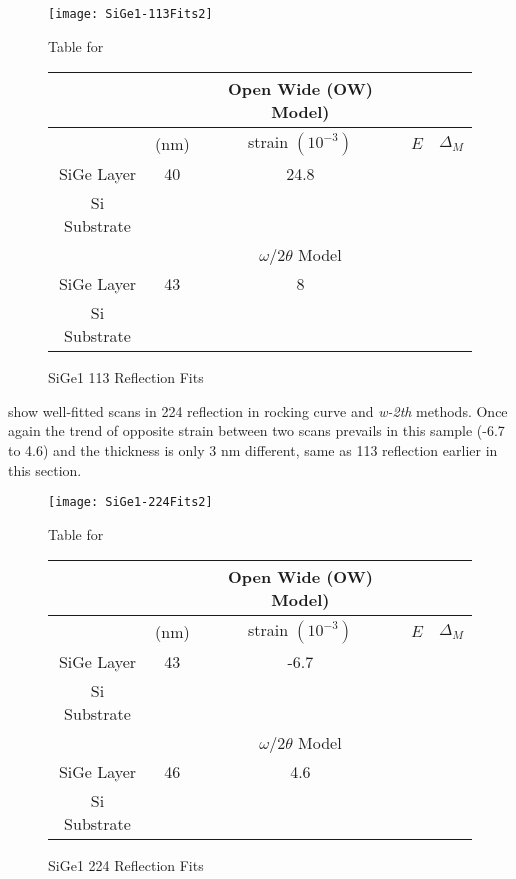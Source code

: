 \begin{figure}[hc]%
\caption{SiGe1 113 Reflection Fits}
\label{SiGe1-113}
\begin{minipage}{0.85\linewidth}
\texttt{[image: SiGe1-113Fits2]}
\end{minipage}
\begin{minipage}{\linewidth}
\centering
\vspace{10pt}
Table for \\
\vspace{5pt}
\begin{tabular}{c|cccc}
			& 	&Open Wide (OW) Model)	 \\
\hline
			&	(nm)	&	strain	 $(10^{-3})$&	$E$ &  $\Delta_M$\\
\hline
SiGe Layer		&  	40	&   24.8	 &\textendash & \textendash\ 	\\
Si Substrate		&	\textemdash & \textemdash&\textemdash\ &\textemdash	\\
\hline
			& &$\omega/2\theta$ Model \\
\hline
SiGe Layer		&	43	& 8	&\textendash&\textendash\ 	\\
Si Substrate		&	\textemdash & \textemdash&\textemdash\ &\textemdash
\end{tabular}
\end{minipage}
\end{figure}

  show well-fitted scans in 224 reflection in rocking curve and \emph{w-2th} methods.  Once again the trend of opposite strain between two scans prevails in this sample (-6.7 to 4.6) and the thickness is only 3 nm different, same as 113 reflection earlier in this section.

\begin{figure}[hc]%
\caption{SiGe1 224 Reflection Fits}
\label{SiGe1-224}
\begin{minipage}{0.85\linewidth}
\texttt{[image: SiGe1-224Fits2]}
\end{minipage}
\begin{minipage}{\linewidth}
\centering
\vspace{10pt}
Table for \\
\vspace{5pt}
\begin{tabular}{c|cccc}
			& 	&Open Wide (OW) Model)	 \\
\hline
			&	(nm)	&	strain	 $(10^{-3})$&	$E$ &  $\Delta_M$\\
\hline
SiGe Layer		&  	43	&      -6.7 &\textendash & \textendash\ 	\\
Si Substrate		&	\textemdash & \textemdash&\textemdash\ &\textemdash	\\
\hline
			& &$\omega/2\theta$ Model \\
\hline
SiGe Layer		&	46	&4.6	&\textendash	&\textendash\ 	\\
Si Substrate		&	\textemdash & \textemdash&\textemdash\ &\textemdash
\end{tabular}
\end{minipage}
\end{figure}

